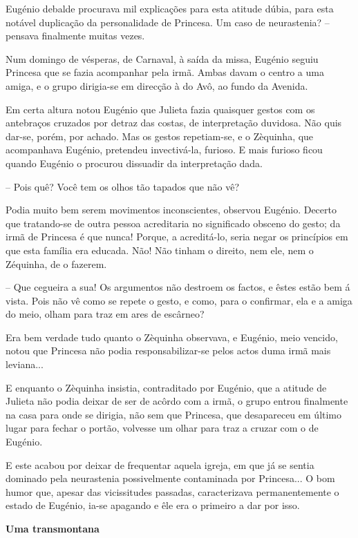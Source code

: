 \documentclass[9pt]{article}
\begin{document}
Eugé\-nio debalde procurava mil explica\-ções para esta atitude dúbia,
para esta notável duplica\-ção da personalidade de Princesa. Um caso de
neurastenia? -- pensava finalmente muitas vezes.

Num domingo de vésperas, de Carnaval, à saída da missa, Eugé\-nio seguiu Princesa que se fazia acompanhar pela irmã. Ambas davam o centro a uma amiga, e o grupo dirigia-se em
direc\-ção à do Avô, ao fundo da Avenida.

Em certa altura notou Eugé\-nio que Julieta fazia quaisquer gestos com os antebraços cruzados por detraz das costas, de interpreta\-ção duvidosa. Não quis dar-se, porém, por achado. Mas os gestos repetiam-se, e o
Zèquinha, que acompanhava Eugé\-nio, pretendeu invectivá-la, furioso. E mais furioso ficou quan\-do Eugé\-nio o procurou dissuadir da interpreta\-ção dada.

-- Pois quê? Você tem os o\-lhos tão tapados que não vê?

Podia muito bem serem movimentos inconscientes, observou Eugé\-nio. Decerto que tratando-se de outra pessoa acreditaria no signifi\-cado obsceno
do gesto; da irmã de Princesa é que nunca! Porque, a acredi\-\mbox{tá-lo}, seria negar os princípios em que esta fa\-mí\-lia era educada. Não! Não tinham o direito, nem ele, nem o Zéquinha, de o fazerem.

-- Que cegueira a sua! Os argumentos não destroem os factos, e êstes
estão bem á vista. Pois não vê como se repete o gesto, e como, para o confirmar, ela e a amiga do meio, o\-lham para traz em ares de escârneo?

Era bem verdade tudo quanto o Zèquinha observava, e Eugé\-nio, meio vencido, notou que Princesa não podia responsabilizar-se pelos actos duma irmã
mais leviana...

E enquanto o Zèquinha insistia, contraditado por Eugé\-nio, que a atitude
de Julieta não podia deixar de ser de acôrdo com a irmã, o grupo entrou finalmente na casa para onde se dirigia, não sem que Princesa, que desapareceu
em último lugar para fechar o portão, volvesse um o\-lhar para traz a cruzar
com o de Eugé\-nio.

E este acabou por deixar de frequentar aquela igreja, em que já se sentia dominado pela neurastenia possivelmente contaminada por Princesa... O
bom humor que, apesar das vicissitudes passadas, ca\-ra\-cte\-ri\-zava permanentemente o estado de Eugé\-nio, ia-se apagando e êle era o primeiro a dar por isso.

\begin{center}\bf\large Uma transmontana\end{center}
\end{document}
